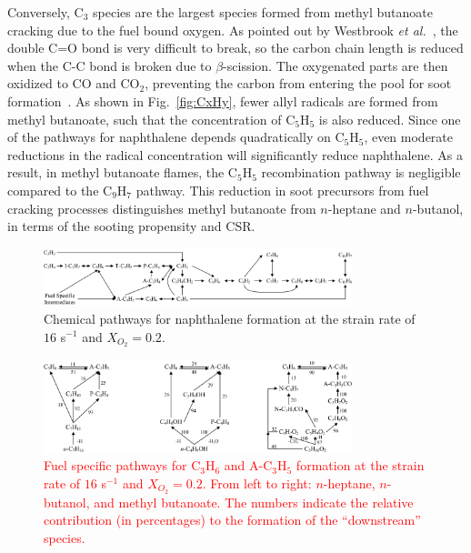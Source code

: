 \documentclass[review,3p,times]{elsarticleUS}
\begin{document}
Conversely, C$_3$ species are the largest species formed from methyl butanoate cracking due to the fuel bound oxygen. As pointed out by Westbrook \emph{et al.}~\cite{westbrook06}, the double C=O bond is very difficult to break, so the carbon chain length is reduced when the C-C bond is broken due to $\beta$-scission. The oxygenated parts are then oxidized to CO and CO$_2$, preventing the carbon from entering the pool for soot formation~\cite{feng12,wangyl11}. As shown in Fig.~\ref{fig:CxHy}, fewer allyl radicals are formed from methyl butanoate, such that the concentration of C$_5$H$_5$ is also reduced. Since one of the pathways for naphthalene depends quadratically on C$_5$H$_5$, even moderate reductions in the radical concentration will significantly reduce naphthalene. As a result, in methyl butanoate flames, the C$_5$H$_5$ recombination pathway is negligible compared to the C$_9$H$_7$ pathway. This reduction in soot precursors from fuel cracking processes distinguishes methyl butanoate from $n$-heptane 
and $n$-butanol, in terms of the sooting propensity and CSR.

\begin{figure}[t]
  \centering
  \scriptsize
  \includegraphics[width=0.8\textwidth]{Pathways-PAH.png}
  \normalsize
  \caption{Chemical pathways for naphthalene formation at the strain rate of $16$ s$^{-1}$ and $X_{O_2}=0.2$.}
  \label{fig:Pathways_PAH}
\end{figure}

\begin{figure}[t]
  \centering
  \scriptsize
  \includegraphics[width=0.8\textwidth]{Pathways_Fuel.png}
  \normalsize
  \caption{\textcolor{red}{Fuel specific pathways for C$_3$H$_6$ and A-C$_3$H$_5$ formation at the strain rate of $16$ s$^{-1}$ and $X_{O_2}=0.2$. From left to right: $n$-heptane, $n$-butanol, and methyl butanoate.  The numbers indicate the relative contribution (in percentages) to the formation of the ``downstream'' species.}}
  \label{fig:Pathways_Fuel}
\end{figure}
\end{document}
